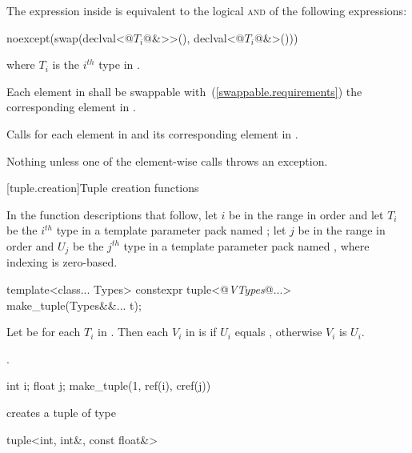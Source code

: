 \begin{itemdescr}
\pnum
\remark The expression inside  is equivalent to the logical
\textsc{and} of the following expressions:

\begin{codeblock}
noexcept(swap(declval<@$T_i$@&>>(), declval<@$T_i$@&>()))
\end{codeblock}

where $T_i$ is the $i^{th}$ type in .

\pnum
\requires
Each element in  shall be swappable with~(\ref{swappable.requirements})
the corresponding element in .

\pnum
\effects Calls  for each element in  and its
corresponding element in .

\pnum
\throws Nothing unless one of the element-wise  calls throws an exception.
\end{itemdescr}

[tuple.creation]{Tuple creation functions}

\pnum
In the function descriptions that follow, let $i$ be in the range 
in order and let $T_i$ be the $i^{th}$ type in a template parameter pack named ;
let $j$ be in the range  in order and $U_j$ be the $j^{th}$ type
in a template parameter pack named , where indexing is zero-based.

%
%
\begin{itemdecl}
template<class... Types>
  constexpr tuple<@\textit{VTypes}@...> make_tuple(Types&&... t);
\end{itemdecl}

\begin{itemdescr} \pnum Let  be  for each
$T_i$ in . Then each $V_i$ in  is
 if $U_i$ equals , otherwise
$V_i$ is $U_i$.

\pnum
\returns {}.

\pnum
\enterexample

\begin{codeblock}
int i; float j;
make_tuple(1, ref(i), cref(j))
\end{codeblock}

creates a tuple of type

\begin{codeblock}
tuple<int, int&, const float&>
\end{codeblock}

\exitexample

\end{itemdescr}

